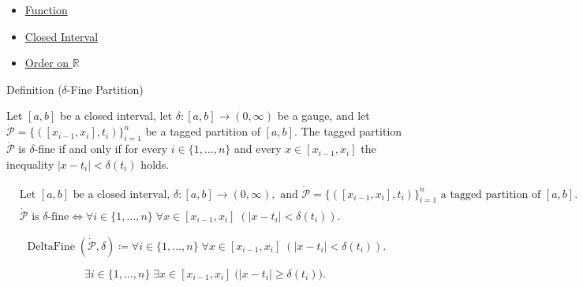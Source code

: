 \begin{dependencies}
\begin{itemize}
  \item \hyperref[def:function]{Function}
  \item \hyperref[def:closed-interval]{Closed Interval}
  \item \hyperref[def:order-on-r]{Order on $\mathbb{R}$}
\end{itemize}
\end{dependencies}

\begin{definitionbox}{Definition ($\delta$-Fine Partition)}
\begin{definition}
\label{def:delta-fine-partition}
Let $[a,b]$ be a closed interval, let $\delta:[a,b]\to(0,\infty)$ be a gauge, and let $\dot{\mathcal{P}}=\{([x_{i-1},x_i],t_i)\}_{i=1}^n$ be a tagged partition of $[a,b]$. The tagged partition $\dot{\mathcal{P}}$ is $\delta$-fine if and only if for every $i \in \{1,\dots,n\}$ and every $x \in [x_{i-1},x_i]$ the inequality $|x-t_i|<\delta(t_i)$ holds.
\end{definition}
\end{definitionbox}

\begin{remark*}
\[
\begin{aligned}
&\text{Let } [a,b] \text{ be a closed interval, } \delta:[a,b]\to(0,\infty), \text{ and } \dot{\mathcal{P}}=\{([x_{i-1},x_i],t_i)\}_{i=1}^n \text{ a tagged partition of } [a,b].\\
&\dot{\mathcal{P}} \text{ is }\delta\text{-fine} \Longleftrightarrow \forall i \in \{1,\dots,n\}\;\forall x \in [x_{i-1},x_i]\;( |x-t_i|<\delta(t_i)).
\end{aligned}
\]
\end{remark*}

\begin{remark*}
\[
\operatorname{DeltaFine}(\dot{\mathcal{P}},\delta) \coloneqq \forall i \in \{1,\dots,n\}\;\forall x \in [x_{i-1},x_i]\;( |x-t_i|<\delta(t_i)).
\]
\end{remark*}

\begin{remark*}
\[
\exists i \in \{1,\dots,n\}\;\exists x \in [x_{i-1},x_i]\;
\bigl(|x-t_i|\ge \delta(t_i)\bigr).
\]
\end{remark*}

